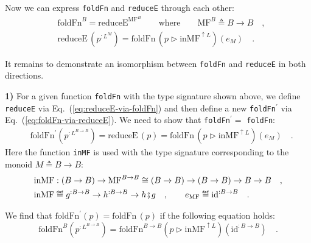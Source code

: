 Now we can express \lstinline!foldFn! and \lstinline!reduceE! through
each other:
\begin{align}
 & \text{foldFn}^{B}=\text{reduceE}^{\text{MF}^{B}}\quad\quad\text{where}\quad\quad\text{MF}^{B}\triangleq B\rightarrow B\quad,\label{eq:foldFn-via-reduceE}\\
 & \text{reduceE}\,(p^{:L^{M}})=\text{foldFn}\,(p\triangleright\text{inMF}^{\uparrow L})(e_{M})\quad.\label{eq:reduceE-via-foldFn}
\end{align}

It remains to demonstrate an isomorphism between \lstinline!foldFn!
and \lstinline!reduceE! in both directions.

\textbf{1)} For a given function \lstinline!foldFn! with the type
signature shown above, we define \lstinline!reduceE! via Eq.~(\ref{eq:reduceE-via-foldFn})
and then define a new \lstinline!foldFn!$^{\prime}$ via Eq.~(\ref{eq:foldFn-via-reduceE}).
We need to show that \lstinline!foldFn!$^{\prime}=$ \lstinline!foldFn!:
\begin{align*}
 & \text{foldFn}^{\prime}(p^{:L^{B\rightarrow B}})=\text{reduceE}\,(p)=\text{foldFn}\,(p\triangleright\text{inMF}^{\uparrow L})(e_{M})\quad.
\end{align*}
Here the function \lstinline!inMF! is used with the type signature
corresponding to the monoid $M\triangleq B\rightarrow B$:
\begin{align*}
 & \text{inMF}:\left(B\rightarrow B\right)\rightarrow\text{MF}^{B\rightarrow B}\cong\left(B\rightarrow B\right)\rightarrow\left(B\rightarrow B\right)\rightarrow B\rightarrow B\quad,\\
 & \text{inMF}\triangleq g^{:B\rightarrow B}\rightarrow h^{:B\rightarrow B}\rightarrow h\bef g\quad,\quad\quad e_{\text{MF}}\triangleq\text{id}^{:B\rightarrow B}\quad.
\end{align*}

We find that $\text{foldFn}^{\prime}(p)=\text{foldFn}\,(p)$ if the
following equation holds:
\begin{equation}
\text{foldFn}^{B}(p^{:L^{B\rightarrow B}})=\text{foldFn}^{B\rightarrow B}(p\triangleright\text{inMF}^{\uparrow L})(\text{id}^{:B\rightarrow B})\quad.\label{eq:foldFn-first-special-law}
\end{equation}

